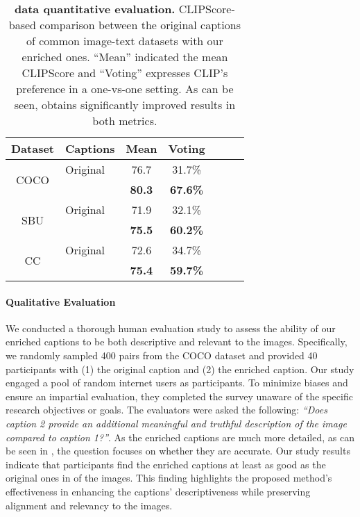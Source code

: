\begin{table}[b]
  \centering
  \vspace{-9pt}
  \begin{tabular}{clccccc}
  \toprule
    Dataset & Captions & Mean & Voting  \\
    \midrule
    \multirow{2}{*}{COCO} & Original & 76.7 & 31.7\%\\
& \fusecap{} & \textbf{80.3} & \textbf{67.6\%} \\
    \midrule
    \multirow{2}{*}{SBU} & Original & 71.9 & 32.1\%\\
& \fusecap{} & \textbf{75.5} & \textbf{60.2\%} \\
    \midrule
    \multirow{2}{*}{CC} & Original & 72.6 & 34.7\%\\
& \fusecap{} & \textbf{75.4} & \textbf{59.7\%} \\
    \bottomrule
  \end{tabular}
\caption{\textbf{\fusecap{} data quantitative evaluation.} CLIPScore-based comparison between the original captions of common image-text datasets with our enriched ones. ``Mean'' indicated the mean CLIPScore and ``Voting'' expresses CLIP's preference in a one-vs-one setting. As can be seen, \fusecap{} obtains significantly improved results in both metrics.}
    \label{tab:caption_clips}
\end{table}





\paragraph{Qualitative Evaluation}
We conducted a thorough human evaluation study to assess the ability of our enriched captions to be both descriptive and relevant to the images. Specifically, we randomly sampled 400 pairs from the COCO dataset 
and provided 40 participants with (1) the original caption and (2) the enriched caption.
Our study engaged a pool of random internet users as participants. To minimize biases and ensure an impartial evaluation, they completed the survey unaware of the specific research objectives or goals.
The evaluators were asked the following:
\textit{``Does caption 2 provide an additional meaningful and truthful description of the image compared to caption 1?''}.
As the enriched captions are much more detailed, as can be seen in , the question focuses on whether they are accurate.
Our study results indicate that participants find the enriched captions at least as good as the original ones in  of the images. This finding highlights the proposed method's effectiveness in enhancing the captions' descriptiveness while preserving alignment and relevancy to the images.

